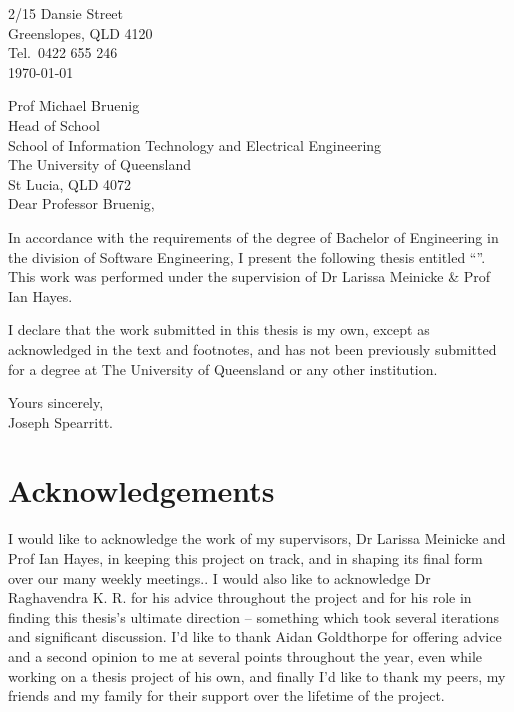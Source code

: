 
\cleardoublepage

\begin{flushright}
	2/15 Dansie Street\\
	Greenslopes, QLD 4120\\
	Tel.\ 0422 655 246\\
	\medskip
	\today
\end{flushright}
\begin{flushleft}
	Prof Michael Bruenig\\
	Head of School\\
	School of Information Technology and Electrical Engineering\\
	The University of Queensland\\
	St Lucia, QLD 4072\\
	\bigskip\bigskip
	Dear Professor Bruenig,
\end{flushleft}

In accordance with the requirements of the degree of Bachelor of Engineering in the division of Software Engineering, I present the following thesis entitled ``\thetitle''. This work was performed under the supervision of Dr Larissa Meinicke \& Prof Ian Hayes.

I declare that the work submitted in this thesis is my own, except as
acknowledged in the text and footnotes, and has not been previously
submitted for a degree at The University of Queensland or any other
institution.
\newline
\begin{flushright}
	Yours sincerely,\\
	\medskip
	$ \; $\vspace*{5mm}\\
	\medskip
	Joseph Spearritt.
\end{flushright}

\cleardoublepage

\chapter{Acknowledgements}

I would like to acknowledge the work of my supervisors, Dr Larissa Meinicke and Prof Ian Hayes, in keeping this project on track, and in shaping its final form over our many weekly meetings.. I would also like to acknowledge Dr Raghavendra K. R. for his advice throughout the project and for his role in finding this thesis's ultimate direction -- something which took several iterations and significant discussion. I'd like to thank Aidan Goldthorpe for offering advice and a second opinion to me at several points throughout the year, even while working on a thesis project of his own, and finally I'd like to thank my peers, my friends and my family for their support over the lifetime of the project.


